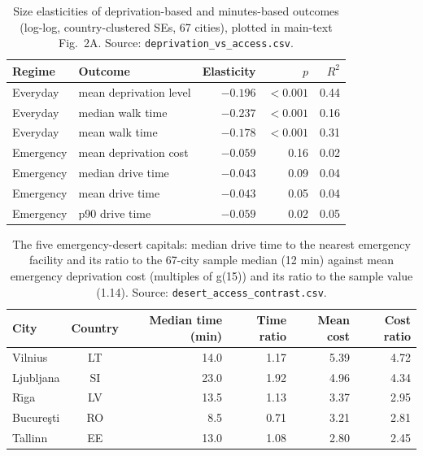 \documentclass[11pt]{article}
\newcommand{\gref}{g(15)}
\begin{document}
\begin{table}[H]
\centering
\caption{Size elasticities of deprivation-based and minutes-based
outcomes (log-log, country-clustered SEs, 67 cities), plotted in main-text
Fig.~2A. Source: \texttt{deprivation\_vs\_access.csv}.}
\label{tab:si-depvsaccess}
\small
\begin{tabular}{@{}llrrr@{}}
\toprule
Regime & Outcome & Elasticity & $p$ & $R^2$ \\
\midrule
Everyday  & mean deprivation level      & $-0.196$ & $<0.001$ & 0.44 \\
Everyday  & median walk time            & $-0.237$ & $<0.001$ & 0.16 \\
Everyday  & mean walk time              & $-0.178$ & $<0.001$ & 0.31 \\
\addlinespace
Emergency & mean deprivation cost       & $-0.059$ & 0.16     & 0.02 \\
Emergency & median drive time           & $-0.043$ & 0.09     & 0.04 \\
Emergency & mean drive time             & $-0.043$ & 0.05     & 0.04 \\
Emergency & p90 drive time              & $-0.059$ & 0.02     & 0.05 \\
\bottomrule
\end{tabular}
\end{table}

\begin{table}[H]
\centering
\caption{The five emergency-desert capitals: median drive time to the
nearest emergency facility and its ratio to the 67-city sample median
(12 min) against mean emergency deprivation cost (multiples of \gref{})
and its ratio to the sample value (1.14). Source:
\texttt{desert\_access\_contrast.csv}.}
\label{tab:deserts}
\small
\begin{tabular}{@{}lcrrrr@{}}
\toprule
City & Country & Median time (min) & Time ratio & Mean cost & Cost ratio \\
\midrule
Vilnius        & LT & 14.0 & 1.17 & 5.39 & 4.72 \\
Ljubljana      & SI & 23.0 & 1.92 & 4.96 & 4.34 \\
R\={\i}ga      & LV & 13.5 & 1.13 & 3.37 & 2.95 \\
Bucure\c{s}ti  & RO &  8.5 & 0.71 & 3.21 & 2.81 \\
Tallinn        & EE & 13.0 & 1.08 & 2.80 & 2.45 \\
\bottomrule
\end{tabular}
\end{table}
\end{document}
